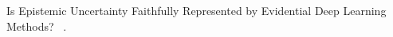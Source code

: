 Is Epistemic Uncertainty Faithfully Represented by Evidential Deep Learning Methods? ~\parencite{Jurgens.}.

